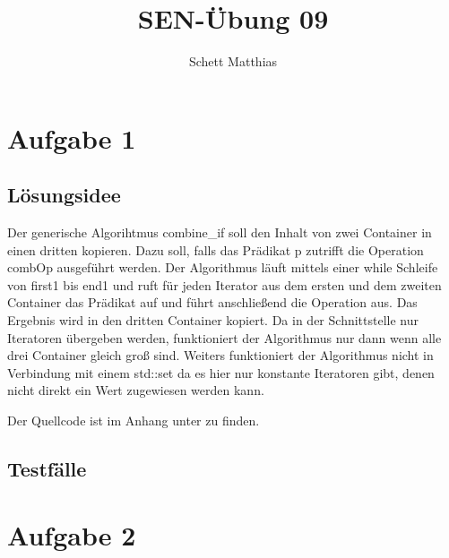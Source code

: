 \documentclass[a4paper,oneside,openany]{tufte-book}
\author{Schett Matthias}
\title{SEN-\"{U}bung 09}
\begin{document}


\frontmatter

\maketitle
\tableofcontents
\mainmatter

\chapter{Aufgabe 1}

\section{L\"{o}sungsidee}

Der generische Algorihtmus combine\_if soll den Inhalt von zwei Container in einen dritten kopieren. Dazu soll, falls das Prädikat p zutrifft die Operation combOp ausgeführt werden.
Der Algorithmus läuft mittels einer while Schleife von first1 bis end1 und ruft für jeden Iterator aus dem ersten und dem zweiten Container das Prädikat auf und führt anschließend die Operation
aus. Das Ergebnis wird in den dritten Container kopiert.
Da in der Schnittstelle nur Iteratoren übergeben werden, funktioniert der Algorithmus nur dann wenn alle drei Container gleich groß sind. Weiters funktioniert der Algorithmus nicht in Verbindung mit einem std::set
da es hier nur konstante Iteratoren gibt, denen nicht direkt ein Wert zugewiesen werden kann.

Der Quellcode ist im Anhang unter  zu finden.

\section{Testf\"{a}lle}
\begin{fullwidth}

\end{fullwidth}

\chapter{Aufgabe 2}
\end{document}
